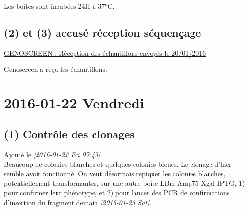\documentclass[9pt, oneside, twocolumn]{scrartcl}
\begin{document}
Les boîtes sont incubées 24H à 37°C. 

\subsection{(2) et (3) accusé réception séquençage}
\label{sec:orgheadline72}
\href{msgid:001501d1542e$943783b0$bca68b10$@genoscreen.fr}{GENOSCREEN : Réception des échantillons envoyés le 20/01/2016}

Genoscreen a reçu les échantillons. 

\section{2016-01-22 Vendredi}
\label{sec:orgheadline75}
\subsection{(1) Contrôle des clonages}
\label{sec:orgheadline74}
Ajouté le \textit{[2016-01-22 Fri 07:43] } \\
Beaucoup de colonies blanches et quelques colonies bleues. Le clonage d'hier
semble avoir fonctionné. On veut désormais repiquer les colonies blanches,
potentiellement transformantes, sur une autre boîte LBm Amp75 Xgal IPTG, 1) pour
confirmer leur phénotype, et 2) pour lancer des PCR de confirmations d'insertion
du fragment demain \textit{[2016-01-23 Sat]}. 
\end{document}
